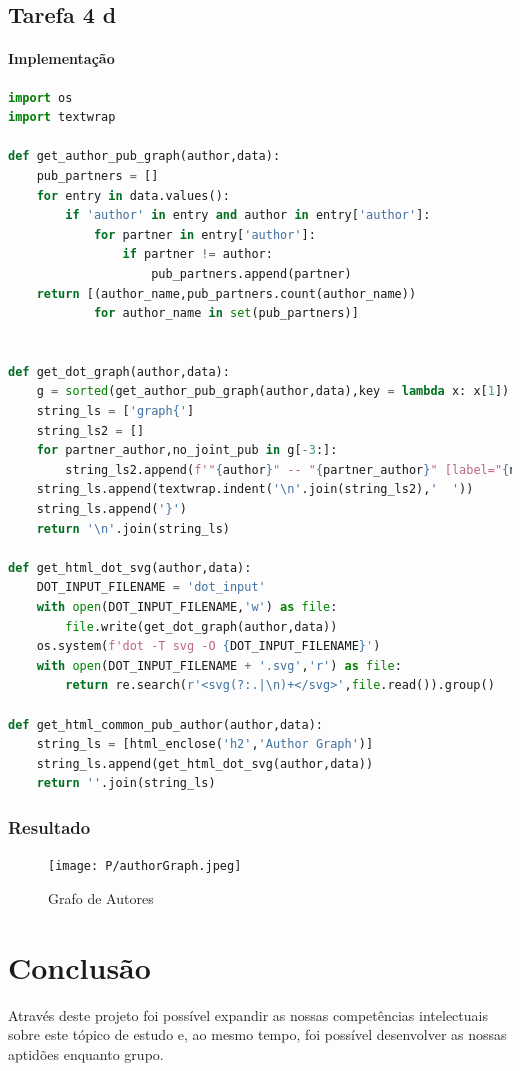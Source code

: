 \documentclass[11pt,a4paper]{report}
\begin{document}
\section{Tarefa 4 d}

\subsubsection{Implementação}
\begin{lstlisting}[language=python]
import os
import textwrap

def get_author_pub_graph(author,data):
    pub_partners = []
    for entry in data.values():
        if 'author' in entry and author in entry['author']:
            for partner in entry['author']:
                if partner != author:
                    pub_partners.append(partner)
    return [(author_name,pub_partners.count(author_name))
            for author_name in set(pub_partners)]


def get_dot_graph(author,data):
    g = sorted(get_author_pub_graph(author,data),key = lambda x: x[1])
    string_ls = ['graph{']
    string_ls2 = []
    for partner_author,no_joint_pub in g[-3:]:
        string_ls2.append(f'"{author}" -- "{partner_author}" [label="{no_joint_pub}"]')
    string_ls.append(textwrap.indent('\n'.join(string_ls2),'  '))
    string_ls.append('}')
    return '\n'.join(string_ls)

def get_html_dot_svg(author,data):
    DOT_INPUT_FILENAME = 'dot_input'
    with open(DOT_INPUT_FILENAME,'w') as file:
        file.write(get_dot_graph(author,data))
    os.system(f'dot -T svg -O {DOT_INPUT_FILENAME}')
    with open(DOT_INPUT_FILENAME + '.svg','r') as file:
        return re.search(r'<svg(?:.|\n)+</svg>',file.read()).group()

def get_html_common_pub_author(author,data):
    string_ls = [html_enclose('h2','Author Graph')]
    string_ls.append(get_html_dot_svg(author,data))
    return ''.join(string_ls)

\end{lstlisting}

\subsection{Resultado}
\begin{figure}[h]
\centering
\texttt{[image: P/authorGraph.jpeg]}
\caption{Grafo de Autores}
\end{figure}


\chapter{Conclusão}
Através deste projeto foi possível expandir as nossas competências intelectuais sobre este tópico de estudo e, ao mesmo tempo, foi possível desenvolver as nossas aptidões enquanto grupo.
\end{document}
